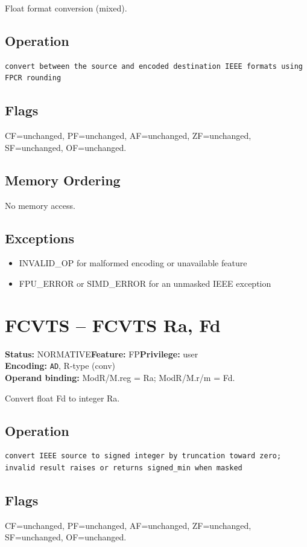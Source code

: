 \documentclass[10pt]{article}
\begin{document}
Float format conversion (mixed).

\subsection*{Operation}
\begin{lstlisting}
convert between the source and encoded destination IEEE formats using FPCR rounding
\end{lstlisting}
\subsection*{Flags}
CF=unchanged, PF=unchanged, AF=unchanged, ZF=unchanged, SF=unchanged, OF=unchanged.
\subsection*{Memory Ordering}
No memory access.
\subsection*{Exceptions}
\begin{itemize}
\item INVALID\_OP for malformed encoding or unavailable feature
\item FPU\_ERROR or SIMD\_ERROR for an unmasked IEEE exception
\end{itemize}
\clearpage

\section{FCVTS -- FCVTS Ra, Fd}
\textbf{Status:} NORMATIVE\quad \textbf{Feature:} FP\quad \textbf{Privilege:} user\\
\textbf{Encoding:} \texttt{AD}, R-type (conv)\\
\textbf{Operand binding:} ModR/M.reg = Ra; ModR/M.r/m = Fd.

Convert float Fd to integer Ra.

\subsection*{Operation}
\begin{lstlisting}
convert IEEE source to signed integer by truncation toward zero; invalid result raises or returns signed_min when masked
\end{lstlisting}
\subsection*{Flags}
CF=unchanged, PF=unchanged, AF=unchanged, ZF=unchanged, SF=unchanged, OF=unchanged.
\end{document}
